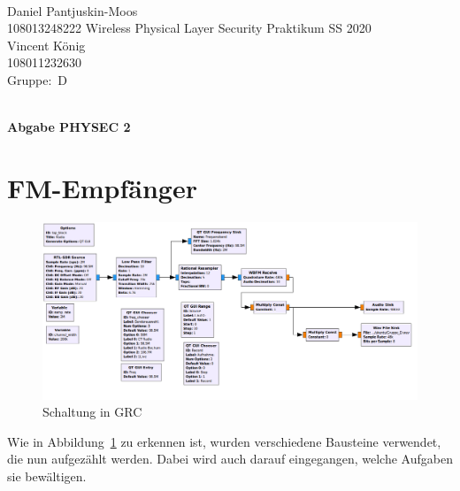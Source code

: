 \documentclass[12pt,a4paper]{article}
\newcommand{\student}{Daniel Pantjuskin-Moos\\ 108013248222 } %
\newcommand{\partner}{Vincent König\\ 108011232630} %
\newcommand{\thirdone}{Max Mustermann\\ 108012345678}
\newcommand{\group}{D} %
\newcommand{\hwheadtwo}{$ $
  \vspace{-2cm}
  
\noindent \student \qquad \qquad  Wireless Physical Layer Security Praktikum \hfill SS 2020 \\
\noindent \partner \\
\noindent Gruppe:~\group\\
$ $

  
\begin{center}    
{\Large \bf Abgabe PHYSEC 2}
\end{center}
}
\begin{document}
\hwheadtwo

\section{FM-Empfänger}



 
\begin{figure}[hbt!]
\centering
	\includegraphics[width=1\textwidth ]
	{Bilder/Aufgabe1-gesamt-grc.png}
	\caption{Schaltung in GRC}
	\label{fig:Label1}
\end{figure}

Wie in Abbildung~\ref{fig:Label1} zu erkennen ist, wurden 
verschiedene Bausteine verwendet, die nun aufgezählt werden. 
Dabei wird auch darauf eingegangen, welche Aufgaben sie bewältigen.
\end{document}
